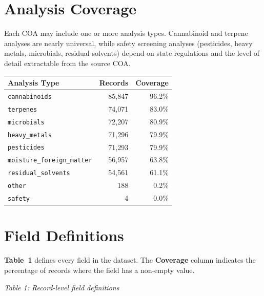\documentclass[11pt,letterpaper]{article}
\begin{document}
\section{Analysis Coverage}

Each COA may include one or more analysis types. Cannabinoid and
terpene analyses are nearly universal, while safety screening
analyses (pesticides, heavy metals, microbials, residual solvents)
depend on state regulations and the level of detail extractable
from the source COA.

\vspace{1em}

{\small
\renewcommand{\arraystretch}{1.3}
\begin{tabularx}{\textwidth}{@{}Xrr@{}}
\toprule
\textbf{Analysis Type} & \textbf{Records} & \textbf{Coverage} \\
\midrule
\texttt{cannabinoids} & 85,847 & 96.2\% \\
\texttt{terpenes} & 74,071 & 83.0\% \\
\texttt{microbials} & 72,207 & 80.9\% \\
\texttt{heavy\_metals} & 71,296 & 79.9\% \\
\texttt{pesticides} & 71,293 & 79.9\% \\
\texttt{moisture\_foreign\_matter} & 56,957 & 63.8\% \\
\texttt{residual\_solvents} & 54,561 & 61.1\% \\
\texttt{other} & 188 & 0.2\% \\
\texttt{safety} & 4 & 0.0\% \\
\bottomrule
\end{tabularx}
}

\section{Field Definitions}

\textbf{Table~1} defines every field in the dataset.
The \textbf{Coverage} column indicates the percentage of records
where the field has a non-empty value.

\vspace{0.5em}

\noindent\textit{Table 1: Record-level field definitions}
\end{document}
